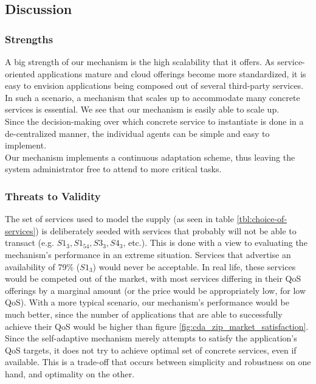 \documentclass[10pt,journal,compsoc]{IEEEtran}
\begin{document}
\subsection{Discussion}
\subsubsection{Strengths}
A big strength of our mechanism is the high scalability that it offers. As service-oriented applications mature and cloud offerings become more standardized, it is easy to envision applications being composed out of several third-party services. In such a scenario, a mechanism that scales up to accommodate many concrete services is essential. We see that our mechanism is easily able to scale up.\\
Since the decision-making over which concrete service to instantiate is done in a de-centralized manner, the individual agents can be simple and easy to implement. \\    
Our mechanism implements a continuous adaptation scheme, thus leaving the system administrator free to attend to more critical tasks.

\subsubsection{Threats to Validity}

The set of services used to model the supply (as seen in table \ref{tbl:choice-of-services}) is deliberately seeded with services that probably will not be able to transact (e.g. $S1_{3}, S1_{54}, S3_{3}, S4_{3}$, etc.). This is done with a view to evaluating the mechanism's performance in an extreme situation. Services that advertise an availability of 79\% ($S1_{3}$) would never be acceptable.  In real life, these services would be competed out of the market, with most services differing in their QoS offerings by a marginal amount (or the price would be appropriately low, for low QoS). With a more typical scenario, our mechanism's performance would be much better, since the number of applications that are able to successfully achieve their QoS would be higher than figure \ref{fig:cda_zip_market_satisfaction}. Since the self-adaptive mechanism merely attempts to satisfy the application's QoS targets, it does not try to achieve  optimal set of concrete services, even if available. This is a trade-off that occurs between simplicity and robustness on one hand, and optimality on the other.\\
\end{document}
